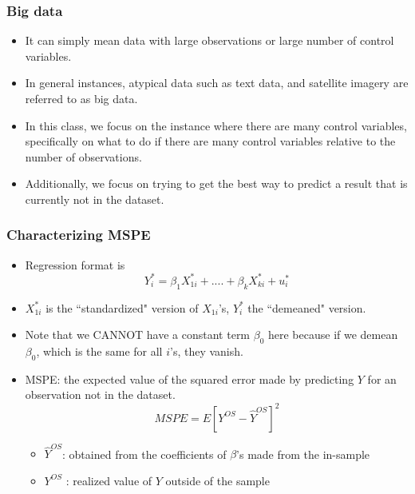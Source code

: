 \documentclass[aspectratio=169]{beamer}
\begin{document}
\begin{frame}
\frametitle{Big data}
\begin{itemize}
\item It can simply mean data with large observations or large number of control variables. 
\item In general instances, atypical data such as text data, and satellite imagery are referred to as big data. 
\item In this class, we focus on the instance where there are many control variables, specifically on what to do if there are many control variables relative to the number of observations. 
\item Additionally, we focus on trying to get the best way to predict a result that is currently not in the dataset.
\end{itemize}
\end{frame}

\begin{frame}
\frametitle{Characterizing MSPE}
\begin{itemize}
\item Regression format is 
\[
Y_{i}^*=\beta_1X_{1i}^*+....+\beta_kX_{ki}^*+u_i^*
\]
\item  $X_{1i}^*$ is the ``standardized" version of $X_{1i}$'s, $Y^*_i$ the ``demeaned" version.
\item  Note that we CANNOT have a constant term $\beta_0$ here because if we demean $\beta_0$, which is the same for all $i$'s, they vanish. 
\item MSPE:  the expected value of the squared error made by predicting $Y$ for an observation not in the dataset.
\[
MSPE= E[Y^{OS}-\hat{Y}^{OS}]^2
\]
\begin{itemize}
\item $\hat{Y}^{OS}$: obtained from the coefficients of $\beta$'s made from the in-sample
\item $Y^{OS}$ : realized value of $Y$ outside of the sample
\end{itemize}
\end{itemize}
\end{frame}
\end{document}
